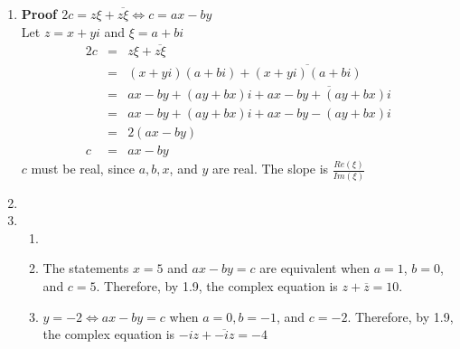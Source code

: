 \documentclass{article}%
\newenvironment{proof}[1][]{\begin{samepage}\textbf{Proof #1} }{\end{samepage}}
\begin{document}
\begin{enumerate}
\begin{enumerate}[label*=\arabic*.]
\begin{enumerate}[label=\alph*]
            \item %
            \begin{proof}[$\frac{1}{z^2}=\frac{\overline{z^2}}{(z\overline{z})^2}$]
                \\ Let $z=x+yi$
                \begin{eqnarray*}
                    \frac{1}{z^2}&=&\frac{1}{(x+yi)^2} \\
                                 &=&\frac{1}{x^2-y^2+2xyi} \\
                                 &=&\frac{1}{x^2-y^2+2xyi}\frac{x^2-y^2-2xyi}{x^2-y^2-2xyi} \\
                                 &=&\frac{x^2-y^2-2xyi}{(x^2-y^2)^2} \\
                                 &=&\frac{\overline{z^2}}{(z\overline{z})^2}
                \end{eqnarray*}
            \end{proof}
        \end{enumerate}
        \item %
        \begin{proof}[$2c=z\xi+\overline{z\xi} \Leftrightarrow c=ax-by$]
            \\ Let $z=x+yi$ and $\xi=a+bi$
            \begin{eqnarray*}
                2c&=&z\xi + \overline{z\xi} \\
                  &=&(x+yi)(a+bi) + \overline{(x+yi)(a+bi)} \\
                  &=&ax-by+(ay+bx)i+\overline{ax-by+(ay+bx)i} \\
                  &=&ax-by+(ay+bx)i+ax-by-(ay+bx)i \\
                  &=&2(ax-by) \\
                 c&=&ax-by
            \end{eqnarray*}
            $c$ must be real, since $a, b, x$, and $y$ are real. The slope is $\frac{Re(\xi)}{Im(\xi)}$
        \end{proof}
        \item %
        \item %
        \begin{enumerate}[label=\alph*]
            \item
            \item The statements $x=5$ and $ax-by=c$ are equivalent when $a=1$, $b=0$, and $c=5$. Therefore, by 1.9, the complex equation is $z+\overline{z}=10$.
            \item $y=-2 \Leftrightarrow ax-by=c$ when $a=0, b=-1$, and $c=-2$. Therefore, by 1.9, the complex equation is $-iz+\overline{-iz}=-4$
        \end{enumerate}
    \end{enumerate}
\end{enumerate}
\end{document}
